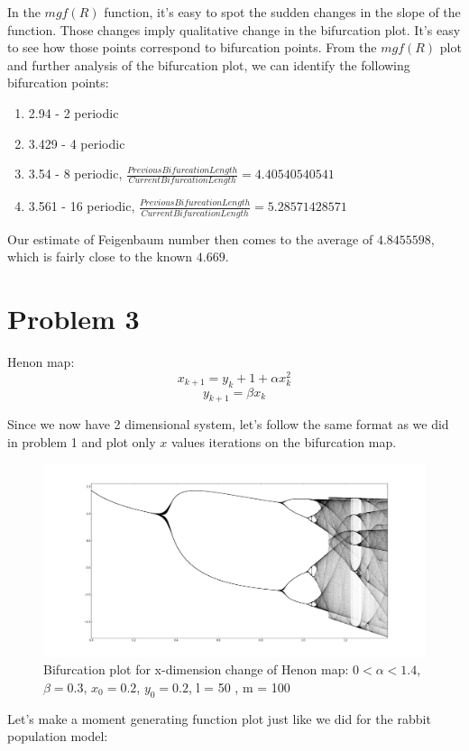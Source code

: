 \documentclass[12pt]{article}\pagestyle{myheadings}
\theoremstyle{plain}
\begin{document}
In the $mgf(R)$ function, it's easy to spot the sudden changes in the slope of the function. Those changes imply qualitative change in the bifurcation plot. It's easy to see how those points correspond to bifurcation points. 
From the $mgf(R)$ plot and further analysis of the bifurcation plot, we can identify the following bifurcation points: 
\begin{enumerate}
\item 2.94 - 2 periodic
\item 3.429 - 4 periodic
\item 3.54 - 8 periodic, $\frac{PreviousBifurcationLength}{CurrentBifurcationLength} = 4.40540540541$
\item 3.561 - 16 periodic, $\frac{PreviousBifurcationLength}{CurrentBifurcationLength} = 5.28571428571$
\end{enumerate}

Our estimate of Feigenbaum number then comes to the average of $4.8455598$, which is fairly close to the known $4.669$. 

\section{Problem 3}
Henon map:
$$x_{k+1} = y_{k} + 1 + \alpha x_{k}^2$$
$$y_{k+1} = \beta x_{k}$$

Since we now have 2 dimensional system, let's follow the same format as we did in problem 1 and plot only $x$ values iterations on the bifurcation map. 

\begin{figure}[h!]
\centering
\includegraphics[scale=.3]{henon_bifurcations}
\caption{Bifurcation plot for x-dimension change of Henon map: $0 < \alpha < 1.4$, $\beta = 0.3$, $x_0 = 0.2$, $y_0 = 0.2$, l = 50 , m = 100}
\label{fig:my_label}
\end{figure}

Let's make a moment generating function plot just like we did for the rabbit population model:
\end{document}

